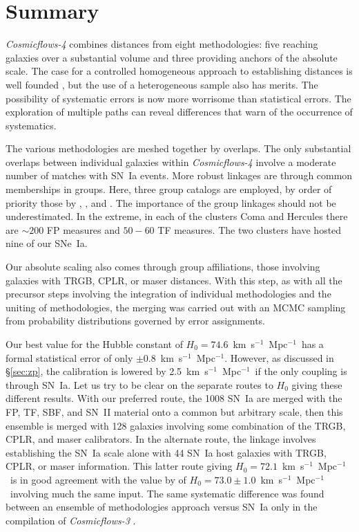 \documentclass[twocolumn]{aastex63}
\newcommand{\kmsMpc}{\mbox{km s$^{-1}$ Mpc$^{-1}$}}
\begin{document}

\section{Summary}
\label{sec:summary}

{\it Cosmicflows-4} combines distances from eight methodologies: five reaching galaxies over a substantial volume and three providing anchors of the absolute scale.  The case for a controlled homogeneous approach to establishing distances is well founded \citep{2019ApJ...876...85R}, but the use of a heterogeneous sample also has merits.   The possibility of systematic errors is now more worrisome than statistical errors.  The exploration of multiple paths can reveal differences that warn of the occurrence of systematics.   

The various methodologies are meshed together by overlaps.  The only substantial overlaps between individual galaxies within {\it Cosmicflows-4} involve a moderate number of matches with SN~Ia events.  More robust linkages are through common memberships in groups.  Here, three group catalogs are employed, by order of priority those by \citet{2017ApJ...843...16K}, \citet{2015AJ....149..171T}, and \citet{2017A&A...602A.100T}.  The importance of the group linkages should not be underestimated.  In the extreme, in each of the clusters Coma and Hercules there are $\sim200$ FP measures and $50-60$ TF measures.  The two clusters have hosted nine of our SNe~Ia. 

Our absolute scaling also comes through group affiliations, those involving galaxies with TRGB, CPLR, or maser distances.  With this step, as with all the precursor steps involving the integration of individual methodologies and the uniting of methodologies, the merging was carried out with an MCMC sampling from probability distributions governed by error assignments.

Our best value for the Hubble constant of $H_0 = 74.6$~\kmsMpc\ has a formal statistical error of only $\pm 0.8$~\kmsMpc.  However, as discussed in \S \ref{sec:zp}, the calibration is lowered by 2.5~\kmsMpc\ if the only coupling is through SN~Ia.  Let us try to be clear on the separate routes to $H_0$ giving these different results.  With our preferred route, the 1008 SN~Ia are merged with the FP, TF, SBF, and SN~II material onto a common but arbitrary scale, then this ensemble is merged with 128 galaxies involving some combination of the TRGB, CPLR, and maser calibrators.  In the alternate route, the linkage involves establishing the SN~Ia scale alone with 44 SN~Ia host galaxies with TRGB, CPLR, or maser information.  This latter route giving $H_0=72.1$~\kmsMpc\ is in good agreement with the value by \citet{2022ApJ...934L...7R} of $H_0=73.0\pm1.0$~\kmsMpc\ involving much the same input.  The same systematic difference was found between an ensemble of methodologies approach versus SN~Ia only in the compilation of {\it Cosmicflows-3} \citep{2016AJ....152...50T}. 
\end{document}
